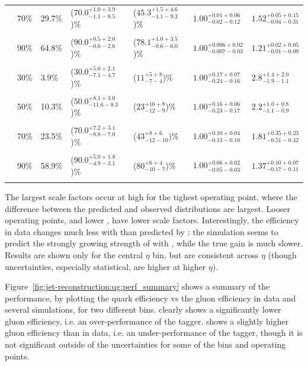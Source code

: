 \begin{table}[htbp]
\begin{center}
\begin{tabular}{|c|l|l|l|l|l|l|}
& 70\% & 29.7\% &  ($70.0^{+1.0+3.9}_{-1.1-8.5}$)\%  & ($45.3^{+1.5+4.6}_{-1.1-9.3}$)\% & $1.00^{+0.01+0.06}_{-0.02-0.12}$ & $1.52^{+0.05+0.15}_{-0.04-0.31}$ \\ &&&&&&\\
& 90\% & 64.8\% &  ($90.0^{+0.5+2.0}_{-0.6-2.6}$)\%  & ($78.1^{+1.0+3.5}_{-0.6-6.0}$)\% & $1.00^{+0.006+0.02}_{-0.007-0.03}$ & $1.21^{+0.02+0.05}_{-0.01-0.09}$ \\ &&&&&&\\
\hline\noalign{\smallskip}
\multirow{4}{*}{\begin{sideways}\centering$\pt=310$--$360 \GeV$\end{sideways}} 
& 30\% &  3.9\% & ($30.0^{+5.0+2.1}_{-7.1-4.7}$)\% & ($11^{+5+8}_{-7-4}$)\% & $1.00^{+0.17+0.07}_{-0.24-0.16}$ & $2.8^{+1.4+2.0}_{-1.9-1.1}$ \\&&&&&&\\
& 50\% & 10.3\% & ($50.0^{+8.1+3.0}_{-11.6-8.3}$)\%& ($23^{+10+8}_{-12-9}$)\%& $1.00^{+0.16+0.06}_{-0.23-0.17}$ & $2.2^{+1.0+0.8}_{-1.1-0.9}$ \\&&&&&&\\
& 70\% & 23.5\% & ($70.0^{+7.2+3.1}_{-8.8-7.0}$)\% & ($43^{+8+6}_{-12-10}$)\% & $1.00^{+0.10+0.04}_{-0.13-0.10}$ & $1.81^{+0.35+0.23}_{-0.51-0.42}$ \\&&&&&&\\
& 90\% & 58.9\% & ($90.0^{+5.0+1.8}_{-4.9-3.1}$)\% & ($80^{+6+4}_{-10-7}$)\% & $1.00^{+0.06+0.02}_{-0.05-0.03}$ & $1.37^{+0.10+0.07}_{-0.17-0.11}$ \\&&&&&&\\
\hline
\end{tabular}
\end{center}
\end{table}

The largest scale factors occur at high \pt for the tighest operating point, where the difference between the predicted and observed \ntrk distributions are largest. Looser operating points, and lower \pt, have lower scale factors. Interestingly, the efficiency in data changes much less with \pt than predicted by \Pythia: the simulation seems to predict the strongly growing strength of \ntrk with \pt, while the true gain is much slower. Results are shown only for the central $\eta$ bin, but are consistent across $\eta$ (though uncertainties, especially statistical, are higher at higher $\eta$).

Figure~\ref{fig:jet-reconstruction:qg:perf_summary} shows a summary of the performance, by plotting the quark efficiency vs the gluon efficiency in data and several simulations, for two different \pt bins. \Pythia clearly shows a significantly lower gluon efficiency, i.e. an over-performance of the tagger. \Herwigpp shows a slightly higher gluon efficiency than in data, i.e. an under-performance of the tagger, though it is not significant outside of the uncertainties for some of the \pt bins and operating points.

